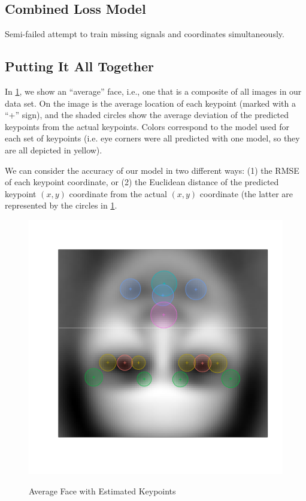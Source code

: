 \documentclass[journal]{IEEEtran}
\begin{document}


\subsection{Combined Loss Model}
Semi-failed attempt to train missing signals and coordinates simultaneously.

\subsection{Putting It All Together}

In \cref{fig:avg_face_rmse}, we show an ``average'' face, i.e., one that is a composite of all images in our data set. On the image is the average location of each keypoint (marked with a ``+'' sign), and the shaded circles show the average deviation of the predicted keypoints from the actual keypoints. Colors correspond to the model used for each set of keypoints (i.e. eye corners were all predicted with one model, so they are all depicted in yellow).

We can consider the accuracy of our model in two different ways: (1) the RMSE of each keypoint coordinate, or (2) the Euclidean distance of the predicted keypoint $(x,y)$ coordinate from the actual $(x,y)$ coordinate (the latter are represented by the circles in \cref{fig:avg_face_rmse}. 

\begin{figure}[!htb]
  \centering
  \caption{Average Face with Estimated Keypoints}
  \includegraphics[scale=.5]{avg_face_rmse.pdf}
  \label{fig:avg_face_rmse}
\end{figure}
\end{document}

